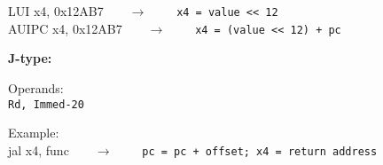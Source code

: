 \begin{description}
\begin{description}
		\textsf{LUI x4, 0x12AB7}\ \ \ \ $\longrightarrow$ \ \ \ \ \texttt{x4 = value << 12}\\
		\textsf{AUIPC x4, 0x12AB7}\ \ \ \ $\longrightarrow$ \ \ \ \ \texttt{x4 = (value << 12) + pc}
	\end{description}
	\item \textbf{J-type:}
	\begin{description}
		\item Operands:\\
		\texttt{Rd, Immed-20}
		\item Example:\\
		\textsf{jal x4, func}\ \ \ \ $\longrightarrow$ \ \ \ \ \texttt{pc = pc + offset; x4 = return address}
	\end{description}
\end{description}
